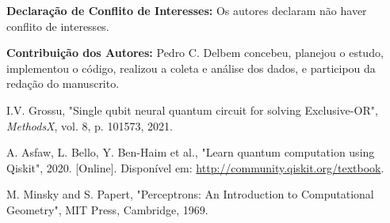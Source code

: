 \documentclass[12pt, a4paper]{article}
\begin{document}
\vspace{1cm}

\noindent \textbf{Declaração de Conflito de Interesses:} Os autores declaram não haver conflito de interesses.

\vspace{0.5cm}

\noindent \textbf{Contribuição dos Autores:} Pedro C. Delbem concebeu, planejou o estudo, implementou o código, realizou a coleta e análise dos dados, e participou da redação do manuscrito.

\begin{thebibliography}{9}

I.V. Grossu, "Single qubit neural quantum circuit for solving Exclusive-OR", \textit{MethodsX}, vol. 8, p. 101573, 2021.

A. Asfaw, L. Bello, Y. Ben-Haim et al., "Learn quantum computation using Qiskit", 2020. [Online]. Disponível em: \url{http://community.qiskit.org/textbook}.

M. Minsky and S. Papert, "Perceptrons: An Introduction to Computational Geometry", MIT Press, Cambridge, 1969.

\end{thebibliography}
\end{document}
